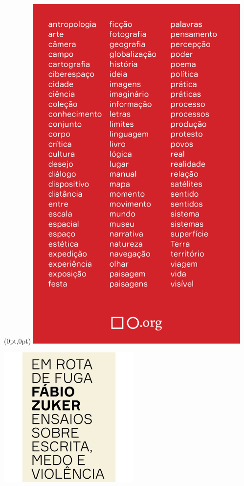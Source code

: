 \pagestyle{quadrado}
\label{quadrado}

\begin{textblock*}{5.625in}(0pt,0pt)%
\vspace*{-1.45cm}
\hspace*{-1.8cm}\includegraphics*[width=112mm]{./imgs/QUADRADO.png}
\end{textblock*}

\pagebreak

\hspace{.5cm}

\begin{center}
\hspace*{-1cm}
\hspace*{1cm}\includegraphics[width=70mm]{./grid/zuker.jpeg}
\end{center}

